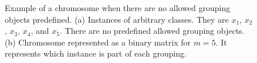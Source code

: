 \begin{figure}[!ht]
\begin{subfigure}{0.6\textwidth}
{\begin{circuitikz}
        
                \end{circuitikz}
            }%
            \caption{} 
            \label{fig:genome_2_example}
        \end{subfigure}
        \caption[Example of a chromosome 2]{Example of a chromosome when there are no allowed grouping objects predefined. (a) Instances of arbitrary classes. They are $x_1$, $x_2$, $x_3$, $x_4$, and $x_5$. There are no predefined allowed grouping objects. (b) Chromosome represented as a binary matrix for $m=5$. It represents which instance is part of each grouping.} 
        \label{fig:genome_2}
    \end{figure}
